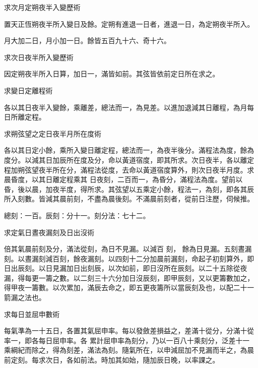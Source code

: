\begin{pinyinscope}
 求次月定朔夜半入變歷術



 置天正恆朔夜半所入變日及餘。定朔有進退一日者，進退一日，為定朔夜半所入。



 月大加二日，月小加一日。餘皆五百九十六、奇十六。



 求次日夜半所入變歷術



 因定朔夜半所入日算，加日一，滿皆如前。其弦皆依前定日所在求之。



 求變日定離程術



 各以其日夜半入變餘，乘離差，總法而一，為見差。以進加退減其日離程，為月每日所離定程。



 求朔弦望之定日夜半月所在度術



 各以其日定小餘，乘所入變日離定程，總法而一，為夜半後分。滿程法為度，餘為度分。以減其日加辰所在度及分，命以黃道宿度，即其所求。次日夜半，各以離定程加朔弦望夜半所在分，滿程法從度，去命以黃道宿度算外，則次日夜半月度。求晨昏度，以其日離定程乘其
 日夜刻，二百而一，為昏分，滿程法為度。望前以昏，後以晨，加夜半度，得所求。其弦望以五乘定小餘，程法一，為刻，即各其辰所入刻數。皆減其晨前刻，不盡為晨後刻。不滿晨前刻者，從前日注歷，伺候推。



 總刻：一百。辰刻：分十一。刻分法：七十二。



 求定氣日晝夜漏刻及日出沒術



 倍其氣晨前刻及分，滿法從刻，為日不見漏。以減百
 刻，
 餘為日見漏。五刻晝漏刻。以晝漏刻減百刻，餘夜漏刻。以四刻十二分加晨前漏刻，命起子初刻算外，即日出辰刻。以日見漏加日出刻辰，以次如前，即日沒所在辰刻。以二十五除從夜漏，得每更一籌之數。以二刻三十六分加日沒辰刻，即甲辰刻，又以更籌數加之，得甲夜一籌數。以次累加，滿辰去命之，即五更夜籌所以當辰刻及也，以配二十一箭漏之法也。



 求每日並屈申數術



 每氣準為一十五日，各置其氣屈申率。每以發斂差損益之，差滿十從分，分滿十從率一，即各每日屈申率。各
 累計屈申率為刻分，乃以一百八十乘刻分，泛差十一乘綱紀而除之，得為刻差，滿法為刻。隨氣所在，以申減屈加不見漏而半之，為晨前定刻。每求次日，各如前法。時加其如始，隨加辰日晚，以率課之。




\end{pinyinscope}

